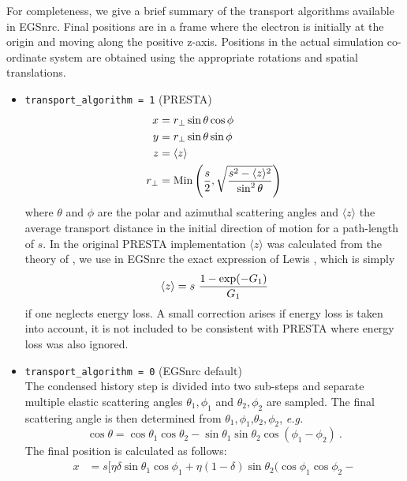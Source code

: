 For completeness, we give a brief summary of the transport
algorithms available in EGSnrc. Final positions are in a frame
where the electron is initially at the origin and moving
along the positive z-axis. Positions in the actual simulation
co-ordinate system are obtained using the appropriate
rotations and spatial translations.
\begin{itemize}
\item
{\tt trans\-port\_algo\-rithm = 1} (PRESTA)
\begin{equation}
\label{PRESTA}
\begin{split}
x &= r_\perp \sin \theta \cos \phi \\
y &= r_\perp \sin \theta \sin \phi \\
z &= \langle z \rangle \\
r_\perp &= \mbox{Min}\left({s \over 2},\sqrt{{s^2 - \langle z \rangle^2 \over
\sin^2 \theta}} \right)
\end{split}
\end{equation}
where $\theta$ and $\phi$ are the polar and azimuthal scattering
angles and $\langle z \rangle$ the average transport distance
in the initial direction of motion for a path-length of $s$.
In the original PRESTA implementation $\langle z \rangle$
was calculated from the theory of \Mol, we use in EGSnrc the
exact expression of Lewis \cite{Le50}, which is simply
\begin{equation}
\langle z \rangle = s~{1 - \exp(-G_1) \over G_1}
\end{equation}
if one neglects energy loss. A small correction arises
if energy loss is taken into account, it is not included
to be consistent with PRESTA where energy loss was also ignored.
\item {\tt trans\-port\_algo\-rithm = 0} (EGSnrc default) \hfill \\
The condensed history step is divided into two sub-steps and
separate multiple elastic scattering angles $\theta_1,\phi_1$ and
$\theta_2,\phi_2$ are sampled. The final scattering angle
is then determined from $\theta_1,\phi_1$,$\theta_2,\phi_2$, {\em e.g.}
\begin{equation}
\cos \theta = \cos \theta_1 \cos \theta_2 - \sin \theta_1 \sin \theta_2
\cos(\phi_1 - \phi_2)~.
\end{equation}
The final position is calculated as follows:
\begin{equation}
\label{egsnrc_algorithm}
\begin{split}
x & = s \Big[ \eta \delta \sin \theta_1 \cos \phi_1 +
\eta (1 - \delta) \sin \theta_2 ( \cos \phi_1 \cos \phi_2 -

\end{split}
\end{equation}
\end{itemize}
